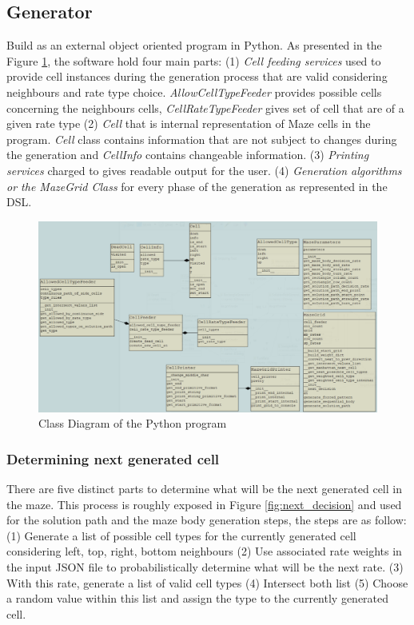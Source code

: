 \documentclass[review]{elsarticle}
\begin{document}
\subsection{Generator}
Build as an external object oriented program in Python. As presented in the Figure \ref{fig:class_diagram}, the software hold four main parts: (1) \textit{Cell feeding services} used to provide cell instances during the generation process that are valid considering neighbours and rate type choice. \textit{AllowCellTypeFeeder} provides possible cells concerning the neighbours cells, \textit{CellRateTypeFeeder} gives set of cell that are of a given rate type (2) \textit{Cell} that is internal representation of Maze cells in the program. \textit{Cell} class contains information that are not subject to changes during the generation and \textit{CellInfo} contains changeable information. (3) \textit{Printing services} charged to gives readable output for the user. (4) \textit{Generation algorithms or the MazeGrid Class} for every phase of the generation as represented in the DSL.

\begin{figure}
	\includegraphics[width=\linewidth]{class_diagram.png}
	\caption{Class Diagram of the Python program}
	\label{fig:class_diagram}
\end{figure}

\subsubsection{Determining next generated cell}
There are five distinct parts to determine what will be the next generated cell in the maze. This process is roughly exposed in Figure \ref{fig:next_decision} and used for the solution path and the maze body generation steps, the steps are as follow: (1) Generate a list of possible cell types for the currently generated cell considering left, top, right, bottom neighbours (2) Use associated rate weights in the input JSON file to probabilistically determine what will be the next rate. (3) With this rate, generate a list of valid cell types (4) Intersect both list (5) Choose a random value within this list and assign the type to the currently generated cell.
\end{document}
